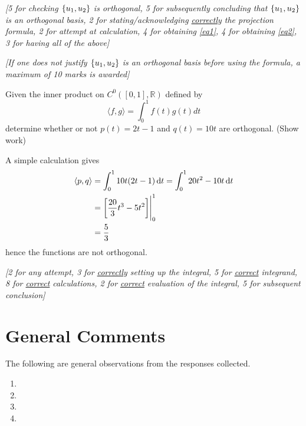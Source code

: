 \documentclass[answers,11pt]{exam}
\theoremstyle{definition}
\DeclareMathOperator{\1}{\mathbbm{1}}
\DeclareMathOperator{\D}{\dif}
\newcommand{\innerproduct}[2]{\left\langle #1,#2 \right\rangle}
\begin{document}
\begin{questions}
\begin{solution}
	\textit{[5 for checking $\set{u_1,u_2}$ is orthogonal, 5 for subsequently concluding that $\set{u_1,u_2}$ is an orthogonal basis, 2 for stating/acknowledging \uline{correctly} the projection formula, 2 for attempt at calculation, 4 for obtaining \eqref{eq1}, 4 for obtaining \eqref{eq2}, 3 for having all of the above]}

	\textit{[If one does not justify $\set{u_1,u_2}$ is an orthogonal basis before using the formula, a maximum of 10 marks is awarded]}
\end{solution}

\question[25] Given the inner product on $C^0([0,1],\mathbb{R})$ defined by 
\begin{equation*}
\langle f,g\rangle =\int_0^1 f(t)g(t)dt
\end{equation*}
determine whether or not $p(t)=2t-1$ and $q(t)=10t$ are orthogonal. (Show work)

\begin{solution}
	A simple calculation gives
	\begin{align*}
		\innerproduct{p}{q} &= \int_{0}^{1} 10t(2t - 1) \D t = \int_{0}^{1} 20t^2 - 10t \D t \\
		&= \eval{\left[ \frac{20}{3} t^3 - 5t^2 \right]}_{0}^{1} \\
		&= \frac{5}{3}
	\end{align*}
	hence the functions are not orthogonal.
	
	\textit{[2 for any attempt, 3 for \uline{correctly} setting up the integral, 5 for \uline{correct} integrand, 8 for \uline{correct} calculations, 2 for \uline{correct} evaluation of the integral, 5 for subsequent conclusion]}
\end{solution}


\end{questions}


\clearpage


\section*{General Comments}

The following are general observations from the responses collected.


\begin{enumerate}
	\item 
	
	
	\item
	
	
	\item
	
	
	\item
\end{enumerate}
\end{document}
